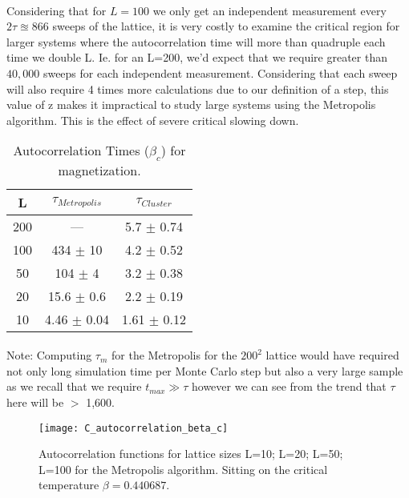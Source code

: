 \documentclass[12pt] {report} %
\begin{document}
			\paragraph{}	
				Considering that for $L=100$ we only get an independent measurement every $2\tau \approxeq 866$ sweeps of the lattice, it is very costly to examine the critical region for larger systems where the autocorrelation time will more than quadruple each time we double L. Ie. for an L=200, we'd expect that we require greater than $40,000$ sweeps for each independent measurement. Considering that each sweep will also require 4 times more calculations due to our definition of a step, this value of z makes it impractical to study large systems using the Metropolis algorithm. This is the effect of severe critical slowing down.
				
			\begin{table}[ht]
				\caption{Autocorrelation Times ($\beta_c$) for magnetization.} %
				\centering %
				\begin{tabular}{c c c} %
					\hline\hline %
					L & $\tau_{Metropolis}$ & $\tau_{Cluster}$  \\ [0.5ex] %
					\hline %
					200 & --- & 5.7 $\pm$ 0.74 \\
					100 & 434 $\pm$ 10 & 4.2 $\pm$ 0.52  \\ %
					50 & 104 $\pm$ 4 & 3.2 $\pm$ 0.38 \\
					20 & 15.6 $\pm$ 0.6 & 2.2 $\pm$ 0.19 \\
					10 & 4.46 $\pm$ 0.04 & 1.61 $\pm$ 0.12 \\ [1ex] %
					\hline %
				\end{tabular}
			\label{table:autocorrelations}
			\end{table}	
			
			\paragraph{}
				Note: Computing $\tau_{m}$ for the Metropolis for the $200^2$ lattice would have required not only long simulation time per Monte Carlo step but also a very large sample as we recall that we require $t_{max} \gg \tau$ however we can see from the trend that $\tau$ here will be $>$ 1,600.
			
			\begin{figure}[h]
				\centering
				\texttt{[image: C\_autocorrelation\_beta\_c]}
				\caption{Autocorrelation functions for lattice sizes L=10; L=20; L=50; L=100 for the Metropolis algorithm. Sitting on the critical temperature $\beta = 0.440687$.}
				\label{fig:C_autocorrelation_beta_c}
			\end{figure}
			
\end{document}
